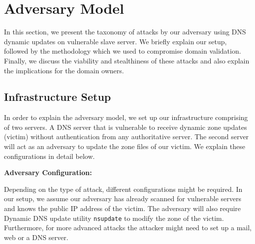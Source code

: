 \section{Adversary Model}

In this section, we present the taxonomy of attacks by our adversary using DNS dynamic updates on vulnerable slave server. We briefly explain our setup, followed by the methodology which we used to compromise domain validation. Finally, we discuss the viability and stealthiness of these attacks and also explain the implications for the domain owners. 


\subsection{Infrastructure Setup}

In order to explain the adversary model, we set up our infrastructure comprising of two servers. A DNS server that is vulnerable to receive  dynamic zone updates (victim) without authentication from any authoritative server. The second server will act as an adversary to update the zone files of our victim.  We explain these configurations in detail below. 


\textbf{Adversary Configuration:} 

Depending on the type of attack, different configurations might be required. In our setup, we assume our adversary has already scanned for vulnerable servers and knows the public IP address of the victim. The adversary will also require Dynamic DNS update utility \texttt{nsupdate} to modify the zone of the victim. Furthermore, for more advanced attacks the attacker might need to set up a mail, web or a DNS server.


